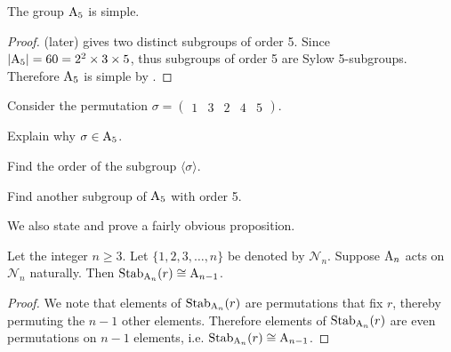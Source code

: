 \begin{corollary}\label{corollary-A5-is-simple}
    The group $\mathrm{A}_{5}$ is simple.
\end{corollary}
\begin{proof}
     (later) gives two distinct subgroups of order 5. Since $|\mathrm{A}_{5}| = 60 = 2^2 \times 3 \times 5$, thus subgroups of order 5 are Sylow 5-subgroups. Therefore $\mathrm{A}_{5}$ is simple by . 
\end{proof}
\begin{exercise}\label{exercise-A5-has-two-distinct-subgroups-of-order-5}
    Consider the permutation $\sigma = \begin{pmatrix}1&3&2&4&5\end{pmatrix}$.
    \begin{partquestions}{\roman*}
        \item Explain why $\sigma \in \mathrm{A}_{5}$.
        \item Find the order of the subgroup $\langle \sigma \rangle$.
        \item Find another subgroup of $\mathrm{A}_{5}$ with order 5.
    \end{partquestions}
\end{exercise}

\newpage

We also state and prove a fairly obvious proposition.
\begin{proposition}\label{prop-An-stabilizer-of-i-is-isomorphic-to-A(n-1)}
    Let the integer $n \geq 3$. Let $\{1, 2, 3, \dots, n\}$ be denoted by $\mathcal{N}_n$. Suppose $\mathrm{A}_{n}$ acts on $\mathcal{N}_n$ naturally. Then $\mathrm{Stab}_{\mathrm{A}_{n}}(r) \cong \mathrm{A}_{n-1}$.
\end{proposition}
\begin{proof}
    We note that elements of $\mathrm{Stab}_{\mathrm{A}_{n}}(r)$ are permutations that fix $r$, thereby permuting the $n - 1$ other elements. Therefore elements of $\mathrm{Stab}_{\mathrm{A}_{n}}(r)$ are even permutations on $n - 1$ elements, i.e. $\mathrm{Stab}_{\mathrm{A}_{n}}(r) \cong \mathrm{A}_{n-1}$.
\end{proof}

